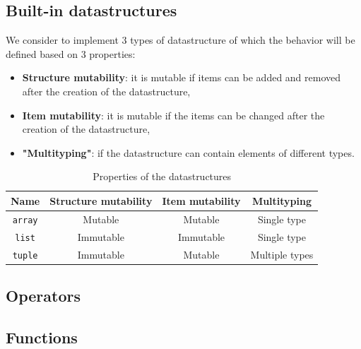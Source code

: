 \documentclass[a4paper,titlepage]{article}
\begin{document}
  \subsection{Built-in datastructures}

We consider to implement 3 types of datastructure of which the behavior will be defined based on 3 properties:
\begin{itemize}
  \item \textbf{Structure mutability}: it is mutable if items can be added and removed after the creation of the datastructure,
  \item \textbf{Item mutability}: it is mutable if the items can be changed after the creation of the datastructure,
  \item \textbf{"Multityping"}: if the datastructure can contain elements of different types. 
\end{itemize}

\begin{table}[h!]
  \center
  \begin{tabular}{c|ccc}
    Name & Structure mutability & Item mutability & Multityping\\
    \hline
    \texttt{array} & Mutable & Mutable & Single type\\
    \texttt{list} & Immutable & Immutable & Single type\\
    \texttt{tuple} & Immutable & Mutable & Multiple types
  \end{tabular}
  \caption{Properties of the datastructures}
\end{table}

  \subsection{Operators}


  \subsection{Functions}



\newpage
\end{document}
